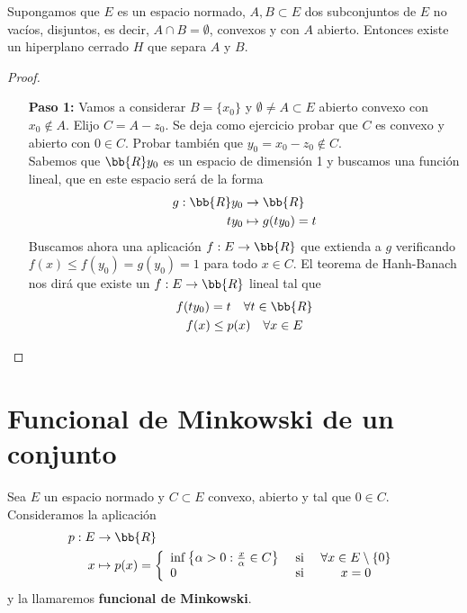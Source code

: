 \begin{teo}
    Supongamos que $E$ es un espacio normado, $A,B\subset E$ dos subconjuntos de $E$ no vacíos, disjuntos, es decir, $A\cap B = \emptyset$, convexos y con $A$ abierto. Entonces existe un hiperplano cerrado $H$ que separa $A$ y $B$.
    \begin{proof}\
        \begin{itemize}
            \item[\textbf{Paso 1:}] Vamos a considerar $B=\{x_0\}$ y $\emptyset \neq A \subset E$ abierto convexo con $x_0\notin A$. Elijo $C = A -z_0$. Se deja como ejercicio probar que $C$ es convexo y abierto con $0\in C$. Probar también que $y_0 = x_0-z_0\notin C$.\\
            
            Sabemos que $\bb{R}y_0$ es un espacio de dimensión 1 y buscamos 
            una función lineal, que en este espacio será de la forma
            \begin{align*}
                g:\bb{R}y_0 &\to \bb{R}\\
                t{y_0} & \mapsto g(t{y_0}) = t
            \end{align*}
            Buscamos ahora una aplicación $f:E \to \bb{R}$ que extienda a $g$ verificando $f(x) \leq f(y_0) = g(y_0) = 1 $ para todo $x\in C$. El teorema de Hanh-Banach nos dirá que existe un $f:E\to \bb{R}$ lineal tal que 
            \begin{gather*}
                f(ty_0) = t \ \ \ \forall t \in \bb{R}\\
                f(x) \leq p(x)\ \ \ \forall x \in E
            \end{gather*}
        \end{itemize}
    \end{proof}
\end{teo}

\section{Funcional de Minkowski de un conjunto}

\begin{definicion}
    Sea $E$ un espacio normado y $C\subset E$ convexo, abierto y tal que $0\in C$. Consideramos la aplicación
    \begin{align*}
        p:E &\to \bb{R}\\
        x & \mapsto p(x) = 
        \left\{
        \begin{array}{l c c}
            \inf\left\{\alpha>0 : \frac{x}{\alpha}\in C\right\} & \text{ si }& \forall x \in E\setminus \{0\}\\
            0 & \text{ si }& x=0
        \end{array}
        \right.
    \end{align*}
    y la llamaremos \textbf{funcional de Minkowski}.
\end{definicion}

